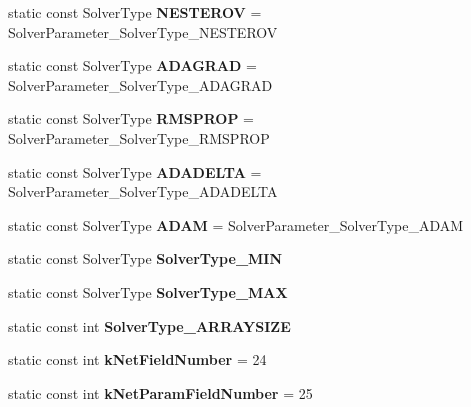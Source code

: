 \begin{DoxyCompactItemize}
\mbox{\label{classcaffe_1_1_solver_parameter_a4bd6f46872fbe84ddbe79221618e895f}} 
static const Solver\+Type {\bfseries N\+E\+S\+T\+E\+R\+OV} = Solver\+Parameter\+\_\+\+Solver\+Type\+\_\+\+N\+E\+S\+T\+E\+R\+OV
\item 
\mbox{\label{classcaffe_1_1_solver_parameter_a670b7015f69d777ce15909bff6504ae3}} 
static const Solver\+Type {\bfseries A\+D\+A\+G\+R\+AD} = Solver\+Parameter\+\_\+\+Solver\+Type\+\_\+\+A\+D\+A\+G\+R\+AD
\item 
\mbox{\label{classcaffe_1_1_solver_parameter_a12088cef4e8ad166da913a7d3fd05753}} 
static const Solver\+Type {\bfseries R\+M\+S\+P\+R\+OP} = Solver\+Parameter\+\_\+\+Solver\+Type\+\_\+\+R\+M\+S\+P\+R\+OP
\item 
\mbox{\label{classcaffe_1_1_solver_parameter_a14a585f2c7cdfd5cd79c2205a2235a13}} 
static const Solver\+Type {\bfseries A\+D\+A\+D\+E\+L\+TA} = Solver\+Parameter\+\_\+\+Solver\+Type\+\_\+\+A\+D\+A\+D\+E\+L\+TA
\item 
\mbox{\label{classcaffe_1_1_solver_parameter_a428077f810cd6ae34e845588739a3b67}} 
static const Solver\+Type {\bfseries A\+D\+AM} = Solver\+Parameter\+\_\+\+Solver\+Type\+\_\+\+A\+D\+AM
\item 
static const Solver\+Type {\bfseries Solver\+Type\+\_\+\+M\+IN}
\item 
static const Solver\+Type {\bfseries Solver\+Type\+\_\+\+M\+AX}
\item 
static const int {\bfseries Solver\+Type\+\_\+\+A\+R\+R\+A\+Y\+S\+I\+ZE}
\item 
\mbox{\label{classcaffe_1_1_solver_parameter_a4613e1f85ec4c3e149a6438ae8f9ab86}} 
static const int {\bfseries k\+Net\+Field\+Number} = 24
\item 
\mbox{\label{classcaffe_1_1_solver_parameter_a48860efb768c84a933dbd35d2d9f3f37}} 
static const int {\bfseries k\+Net\+Param\+Field\+Number} = 25
\item 
\mbox{\label{classcaffe_1_1_solver_parameter_aa72d900fed571d633830e45add42cc32}} 

\end{DoxyCompactItemize}
